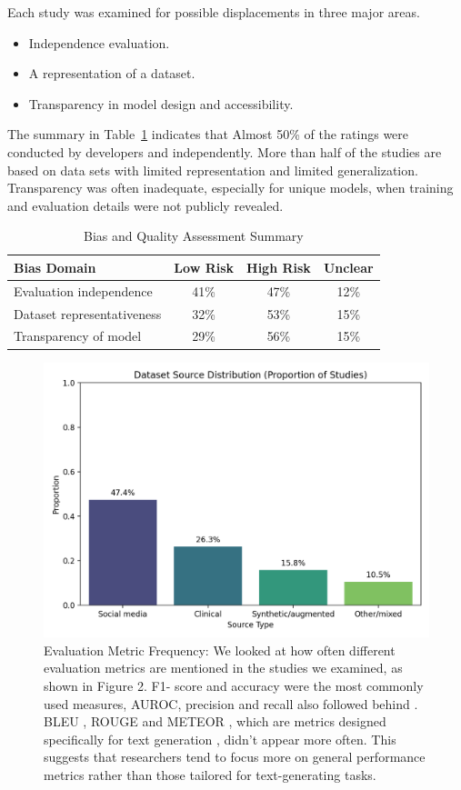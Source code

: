 \documentclass[sn-basic,authoryear]{sn-jnl}
\begin{document}
Each study was examined for possible displacements in three major areas.
\begin{itemize}
    \item Independence evaluation.
    \item A representation of a dataset.
    \item Transparency in model design and accessibility.
\end{itemize}
 The summary in Table~\ref{tab:bias_assessment} indicates that Almost 50\% of the ratings were conducted by developers and independently. More than half of the studies are based on data sets with limited representation and limited generalization. Transparency was often inadequate, especially for unique models, when training and evaluation details were not publicly revealed.

\begin{table}[h]
\centering
\caption{Bias and Quality Assessment Summary}
\begin{tabular}{lccc}
\hline
\textbf{Bias Domain} & \textbf{Low Risk} & \textbf{High Risk} & \textbf{Unclear} \\
\hline
Evaluation independence & 41\% & 47\% & 12\% \\
Dataset representativeness & 32\% & 53\% & 15\% \\
Transparency of model & 29\% & 56\% & 15\% \\
\hline
\end{tabular}
\label{tab:bias_assessment}
\end{table}

\begin{figure}
    \centering
    \includegraphics[width=1.0\linewidth]{chart.png}
    \caption{Evaluation Metric Frequency: We looked at how often different evaluation metrics are mentioned in the studies we examined, as shown in Figure 2. F1- score and accuracy were the most commonly used measures, AUROC, precision and recall also followed behind . BLEU , ROUGE and METEOR , which are metrics designed specifically for text generation , didn't appear more often. This suggests that researchers tend to focus more on general performance metrics rather than those tailored for text-generating tasks.}
    \label{fig:dataset_imbalance}
\end{figure}
\end{document}
